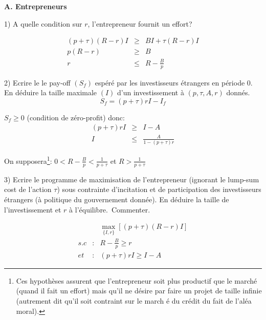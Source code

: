 \documentclass[a4paper]{article}
\begin{document}
\bigskip

\textbf{A. Entrepreneurs}

\bigskip

1) A quelle condition sur $r$, l'entrepreneur fournit un effort?

\begin{eqnarray*}
(p+\tau )\left( R-r\right) I &\geq &BI+\tau \left( R-r\right) I \\
p\left( R-r\right) &\geq &B \\
r &\leq &R-\frac{B}{p}
\end{eqnarray*}

\bigskip

2) Ecrire le le pay-off $\left( S_{f}\right) $ esp\'{e}r\'{e} par les
investisseurs \'{e}trangers en p\'{e}riode $0$. En d\'{e}duire la taille
maximale $\left( I\right) $ d'un investissement \`{a} $\left( p,\tau
,A,r\right) $ donn\'{e}s.%
\begin{equation*}
S_{f}=(p+\tau )rI-I_{f}
\end{equation*}

$S_{f}\geq 0$ (condition de z\'{e}ro-profit) donc:%
\begin{eqnarray*}
(p+\tau )rI &\geq &I-A \\
I &\leq &\frac{A}{1-(p+\tau )r}
\end{eqnarray*}

\bigskip

On supposera\footnote{%
Ces hypoth\`{e}ses assurent que l'entrepreneur soit plus productif que le
march\'{e} (quand il fait un effort) mais qu'il ne d\'{e}sire par faire un
projet de taille infinie (autrement dit qu'il soit contraint sur le march%
\'{e} du cr\'{e}dit du fait de l'al\'{e}a moral).}: $0<R-\frac{B}{p}<\frac{1%
}{p+\tau }$ et $R>\frac{1}{p+\tau }$

\bigskip

3) Ecrire le programme de maximisation de l'entrepreneur (ignorant le
lump-sum cost de l'action $\tau $) sous contrainte d'incitation et de
participation des investisseurs \'{e}trangers (\`{a} politique du
gouvernement donn\'{e}e). En d\'{e}duire la taille de l'investissement et $r$
\`{a} l'\'{e}quilibre.\ Commenter.

\begin{eqnarray*}
&&\max_{\{I,r\}}\left[ (p+\tau )\left( R-r\right) I\right] \\
s.c &:&R-\frac{B}{p}\geq r \\
et &:&(p+\tau )rI\geq I-A
\end{eqnarray*}
\end{document}
